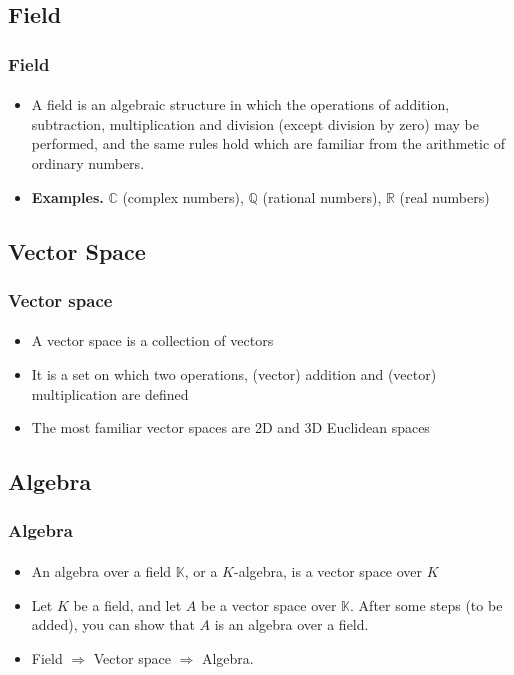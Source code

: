\subsection{Field}
\begin{frame}
\frametitle{Field}
\framesubtitle{}
\logoCSIPCPL\mypagenum\mypagenum
	\begin{itemize}
		\item A field is an algebraic structure in which the operations of addition, subtraction, multiplication and division (except division by zero) may be performed, and the same rules hold which are familiar from the arithmetic of ordinary numbers.
		\item \textbf{Examples.}  $\mathbb{C}$ (complex numbers), $\mathbb{Q}$
(rational numbers), $\mathbb{R}$ (real numbers)
	\end{itemize}
\end{frame}


\subsection{Vector Space}
\begin{frame}
\frametitle{Vector space}
\framesubtitle{}
\logoCSIPCPL\mypagenum\mypagenum
	\begin{itemize}
		\item A vector space is a collection of vectors
		\item  It is a set on which two operations, (vector) addition and (vector) multiplication are defined
		\item The most familiar vector spaces are 2D and 3D Euclidean spaces
	\end{itemize}
\end{frame}


\subsection{Algebra}
\begin{frame}
\frametitle{Algebra}
\framesubtitle{}
\logoCSIPCPL\mypagenum\mypagenum
	\begin{itemize}
		\item An algebra over a field $\mathbb{K}$, or a $K$-algebra, is a vector space over $K$
		\item Let $K$ be a field, and let $A$ be a vector space over $\mathbb{K}$.  After some steps (to be added), you can show that $A$ is an algebra over a field.
		\item Field $\Rightarrow$ Vector space $\Rightarrow$ Algebra.
	\end{itemize}
\end{frame}

